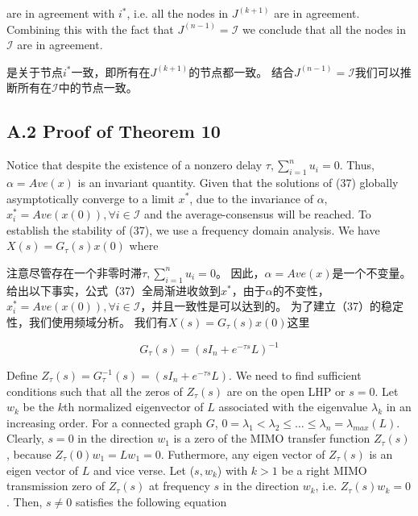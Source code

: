 \documentclass{article}
\begin{document}
{\color[gray]{0.5}
\noindent are in agreement with $i^*$, i.e. all the nodes in $J^{(k+1)}$ are in agreement. 
Combining this with the fact that $J^{(n-1)}=\mathcal{I}$ we conclude that all the nodes in $\mathcal{I}$ are in agreement.
}

\noindent 是关于节点$i^*$一致，即所有在$J^{(k+1)}$的节点都一致。
结合$J^{(n-1)}=\mathcal{I}$我们可以推断所有在$\mathcal{I}$中的节点一致。

\subsection*{A.2 Proof of Theorem 10}

{\color[gray]{0.5}
\noindent Notice that despite the existence of a nonzero delay $\tau, \sum_{i=1}^{n} u_i=0$. 
Thus, $\alpha=Ave(x)$ is an invariant quantity. 
Given that the solutions of (37) globally asymptotically converge to a limit $x^*$, due to the invariance of $\alpha$, $x_i^*=Ave(x(0)), \forall i \in \mathcal{I}$ and the average-consensus will be reached. 
To establish the stability of (37), we use a frequency domain analysis. 
We have $X(s) = G_{\tau}(s)x(0)$ where
}

\noindent 注意尽管存在一个非零时滞$\tau, \sum_{i=1}^{n} u_i=0$。
因此，$\alpha=Ave(x)$是一个不变量。
给出以下事实，公式（37）全局渐进收敛到$x^*$，由于$\alpha$的不变性，$x_i^*=Ave(x(0)), \forall i \in \mathcal{I}$，并且一致性是可以达到的。
为了建立（37）的稳定性，我们使用频域分析。
我们有$X(s) = G_{\tau}(s)x(0)$这里

\begin{equation}
    \tag{51}
    \label{51}
    G_{\tau}(s) = (sI_n + e^{-\tau s}L)^{-1}
\end{equation}

{\color[gray]{0.5}
\noindent Define $Z_{\tau}(s) = G_{\tau}^{-1}(s) = (sI_n + e^{-\tau s}L)$. 
We need to find sufficient conditions such that all the zeros of $Z_{\tau}(s)$ are on the open LHP or $s=0$. 
Let $w_k$ be the $k$th normalized eigenvector of $L$ associated with the eigenvalue $\lambda_k$ in an increasing order. 
For a connected graph $G$, $0=\lambda_1 < \lambda_2 \le \dots \le \lambda_n =\lambda_{max}(L)$. 
Clearly, $s=0$ in the direction $w_1$ is a zero of the MIMO transfer function $Z_{\tau}(s)$, because $Z_{\tau}(0)w_1 = Lw_1 = 0$. 
Futhermore, any eigen vector of $Z_{\tau}(s)$ is an eigen vector of $L$ and {\color{green}vice verse}. 
Let ($s,w_k$) with $k>1$ be a right MIMO transmission zero of $Z_{\tau}(s)$ at frequency $s$ in the direction $w_k$, i.e. $Z_{\tau}(s)w_k=0$. 
Then, $s\ne0$ satisfies the following equation
}
\end{document}
